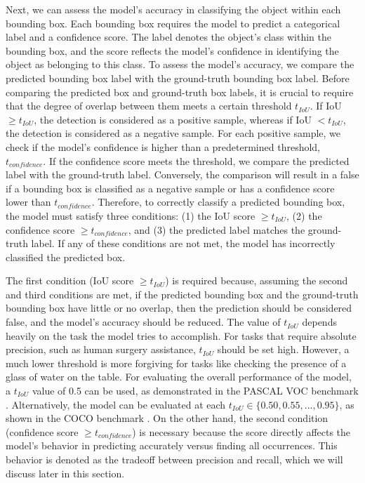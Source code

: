 Next, we can assess the model's accuracy in classifying the object within each bounding box. Each bounding box requires the model to predict a categorical label and a confidence score. The label denotes the object's class within the bounding box, and the score reflects the model's confidence in identifying the object as belonging to this class. To assess the model's accuracy, we compare the predicted bounding box label with the ground-truth bounding box label. Before comparing the predicted box and ground-truth box labels, it is crucial to require that the degree of overlap between them meets a certain threshold $t_{IoU}$. If IoU $\geq t_{IoU}$, the detection is considered as a positive sample, whereas if IoU $< t_{IoU}$, the detection is considered as a negative sample. For each positive sample, we check if the model's confidence is higher than a predetermined threshold, $t_{confidence}$. If the confidence score meets the threshold, we compare the predicted label with the ground-truth label. Conversely, the comparison will result in a false if a bounding box is classified as a negative sample or has a confidence score lower than $t_{confidence}$. Therefore, to correctly classify a predicted bounding box, the model must satisfy three conditions: (1) the IoU score $\geq t_{IoU}$, (2) the confidence score $\geq t_{confidence}$, and (3) the predicted label matches the ground-truth label. If any of these conditions are not met, the model has incorrectly classified the predicted box.

The first condition (IoU score $\geq t_{IoU}$) is required because, assuming the second and third conditions are met, if the predicted bounding box and the ground-truth bounding box have little or no overlap, then the prediction should be considered false, and the model's accuracy should be reduced. The value of $t_{IoU}$ depends heavily on the task the model tries to accomplish. For tasks that require absolute precision, such as human surgery assistance, $t_{IoU}$ should be set high. However, a much lower threshold is more forgiving for tasks like checking the presence of a glass of water on the table. For evaluating the overall performance of the model, a $t_{IoU}$ value of 0.5 can be used, as demonstrated in the PASCAL VOC benchmark \cite{pascal_voc_2015}. Alternatively, the model can be evaluated at each $t_{IoU} \in \{0.50, 0.55, ..., 0.95\}$, as shown in the COCO benchmark \cite{coco_2014}. On the other hand, the second condition (confidence score $\geq t_{confidence}$) is necessary because the score directly affects the model's behavior in predicting accurately versus finding all occurrences. This behavior is denoted as the tradeoff between precision and recall, which we will discuss later in this section.

